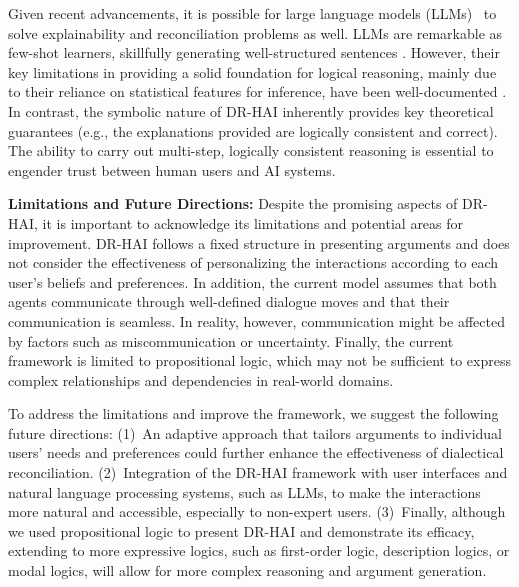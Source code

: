\documentclass{ecai}
\begin{document}
Given recent advancements, it is possible for large language models (LLMs)~\cite{bommasani2021opportunities} to solve explainability and reconciliation problems as well. LLMs are remarkable as few-shot learners, skillfully generating well-structured sentences \cite{brown2020language,lu2022pretrained}. However, their key limitations in providing a solid foundation for logical reasoning, mainly due to their reliance on statistical features for inference, have been well-documented \cite{rae2021scaling,creswellselection}. In contrast, the symbolic nature of DR-HAI inherently provides key theoretical guarantees (e.g., the explanations provided are logically consistent and correct). The ability to carry out multi-step, logically consistent reasoning is essential to engender trust between human users and AI systems. %


 \smallskip 
\noindent \textbf{Limitations and Future Directions: } Despite the promising aspects of DR-HAI, it is important to acknowledge its limitations and potential areas for improvement. 
%
DR-HAI follows a fixed structure in presenting arguments and does not consider the effectiveness of personalizing the interactions according to each user's beliefs and preferences. In addition, the current model assumes that both agents communicate through well-defined dialogue moves and that their communication is seamless. In reality, however, communication might be affected by factors such as miscommunication or uncertainty. Finally, the current framework is limited to propositional logic, which may not be sufficient to express complex relationships and dependencies in real-world domains.
 
To address the limitations and improve the framework, we suggest the following future directions: (1)~An adaptive approach that tailors arguments to individual users' needs and preferences could further enhance the effectiveness of dialectical reconciliation. %
%
(2)~Integration of the DR-HAI framework with user interfaces and natural language processing systems, such as LLMs, to make the interactions more natural and accessible, especially to non-expert users. 
(3)~Finally, although we used propositional logic to present DR-HAI and demonstrate its efficacy, extending to more expressive logics, such as first-order logic,
description logics, or modal logics, will allow for more complex reasoning and argument generation. 













\end{document}
